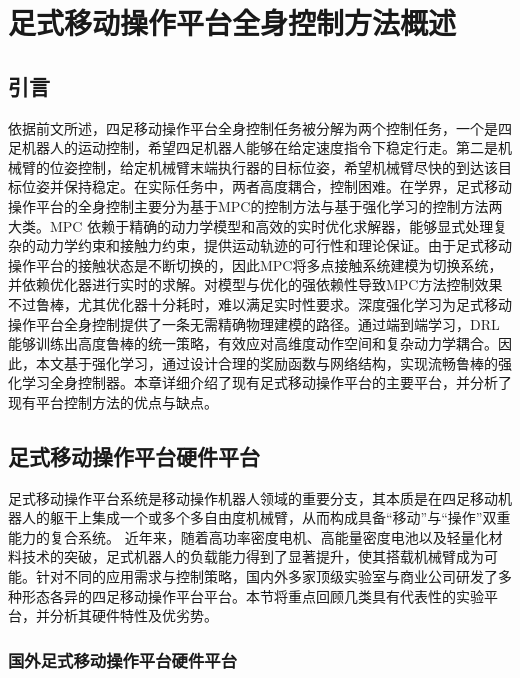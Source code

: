 \chapter{足式移动操作平台全身控制方法概述}

\section{引言}

依据前文所述，四足移动操作平台全身控制任务被分解为两个控制任务，一个是四足机器人的运动控制，希望四足机器人能够在给定速度指令下稳定行走。第二是机械臂的位姿控制，给定机械臂末端执行器的目标位姿，希望机械臂尽快的到达该目标位姿并保持稳定。在实际任务中，两者高度耦合，控制困难。在学界，足式移动操作平台的全身控制主要分为基于MPC的控制方法与基于强化学习的控制方法两大类。MPC 依赖于精确的动力学模型和高效的实时优化求解器，能够显式处理复杂的动力学约束和接触力约束，提供运动轨迹的可行性和理论保证。由于足式移动操作平台的接触状态是不断切换的，因此MPC将多点接触系统建模为切换系统，并依赖优化器进行实时的求解。对模型与优化的强依赖性导致MPC方法控制效果不过鲁棒，尤其优化器十分耗时，难以满足实时性要求。深度强化学习为足式移动操作平台全身控制提供了一条无需精确物理建模的路径。通过端到端学习，DRL 能够训练出高度鲁棒的统一策略，有效应对高维度动作空间和复杂动力学耦合。因此，本文基于强化学习，通过设计合理的奖励函数与网络结构，实现流畅鲁棒的强化学习全身控制器。本章详细介绍了现有足式移动操作平台的主要平台，并分析了现有平台控制方法的优点与缺点。

\section{足式移动操作平台硬件平台}

足式移动操作平台系统是移动操作机器人领域的重要分支，其本质是在四足移动机器人的躯干上集成一个或多个多自由度机械臂，从而构成具备“移动”与“操作”双重能力的复合系统。
近年来，随着高功率密度电机、高能量密度电池以及轻量化材料技术的突破，足式机器人的负载能力得到了显著提升，使其搭载机械臂成为可能。针对不同的应用需求与控制策略，国内外多家顶级实验室与商业公司研发了多种形态各异的四足移动操作平台平台。本节将重点回顾几类具有代表性的实验平台，并分析其硬件特性及优劣势。

\subsection{国外足式移动操作平台硬件平台}

